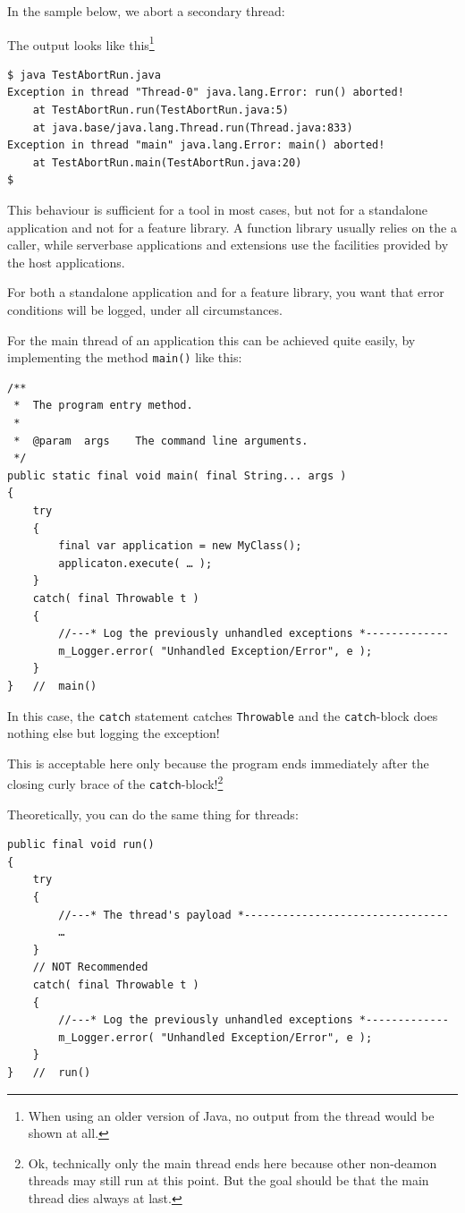 \documentclass[11pt,a4paper, titlepage, parskip=half, headsepline, footsepline, cleardoublepage=current, headheight=1cm]{scrbook}
\begin{document}
In the sample below, we abort a secondary thread:


The output looks like this\footnote{When using an older version of Java, no output from the thread would be shown at all.}
\begin{verbatim}
$ java TestAbortRun.java
Exception in thread "Thread-0" java.lang.Error: run() aborted!
    at TestAbortRun.run(TestAbortRun.java:5)
    at java.base/java.lang.Thread.run(Thread.java:833)
Exception in thread "main" java.lang.Error: main() aborted!
    at TestAbortRun.main(TestAbortRun.java:20)
$ 
\end{verbatim}

This behaviour is sufficient for a tool in most cases, but not for a standalone application and not for a feature library. A function library usually relies on the a caller, while serverbase applications and extensions use the facilities provided by the host applications.

For both a standalone application and for a feature library, you want that error conditions will be logged, under all circumstances.

For the main thread of an application this can be achieved quite easily, by implementing the method \lstinline|main()| like this:
\begin{lstlisting}
/**
 *  The program entry method.
 *
 *  @param  args    The command line arguments.
 */
public static final void main( final String... args )
{
    try
    {
        final var application = new MyClass();
        applicaton.execute( … );
    }
    catch( final Throwable t )
    {
        //---* Log the previously unhandled exceptions *-------------
        m_Logger.error( "Unhandled Exception/Error", e );
    }
}   //  main()
\end{lstlisting}
In this case, the \lstinline|catch| statement catches \lstinline|Throwable| and the 
\lstinline|catch|-block does nothing else but logging the exception!

This is acceptable here only because the program ends immediately after the closing curly brace of the \lstinline|catch|-block!\footnote{Ok, technically only the main thread ends here because other non-deamon threads may still run at this point. But the goal should be that the main thread dies always at last.}

Theoretically, you can do the same thing for threads:
\begin{lstlisting}
public final void run()
{
    try
    {
        //---* The thread's payload *--------------------------------
        …
    }
    // NOT Recommended
    catch( final Throwable t )
    {
        //---* Log the previously unhandled exceptions *-------------
        m_Logger.error( "Unhandled Exception/Error", e );
    }
}   //  run()
\end{lstlisting}
\end{document}
